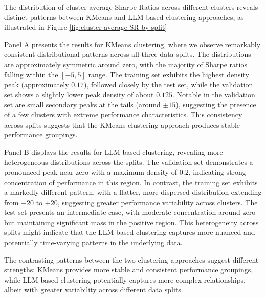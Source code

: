 The distribution of cluster-average Sharpe Ratios across different clusters reveals distinct patterns between KMeans and LLM-based clustering approaches, as illustrated in Figure \ref{fig:cluster-average-SR-by-split}

Panel A presents the results for KMeans clustering, where we observe remarkably consistent distributional patterns across all three data splits. The distributions are approximately symmetric around zero, with the majority of Sharpe ratios falling within the $[-5, 5]$ range. The training set exhibits the highest density peak (approximately $0.17$), followed closely by the test set, while the validation set shows a slightly lower peak density of about $0.125$. Notable in the validation set are small secondary peaks at the tails (around $\pm 15$), suggesting the presence of a few clusters with extreme performance characteristics. This consistency across splits suggests that the KMeans clustering approach produces stable performance groupings.

Panel B displays the results for LLM-based clustering, revealing more heterogeneous distributions across the splits. The validation set demonstrates a pronounced peak near zero with a maximum density of $0.2$, indicating strong concentration of performance in this region. In contrast, the training set exhibits a markedly different pattern, with a flatter, more dispersed distribution extending from $-20$ to $+20$, suggesting greater performance variability across clusters. The test set presents an intermediate case, with moderate concentration around zero but maintaining significant mass in the positive region. This heterogeneity across splits might indicate that the LLM-based clustering captures more nuanced and potentially time-varying patterns in the underlying data.

The contrasting patterns between the two clustering approaches suggest different strengths: KMeans provides more stable and consistent performance groupings, while LLM-based clustering potentially captures more complex relationships, albeit with greater variability across different data splits.

